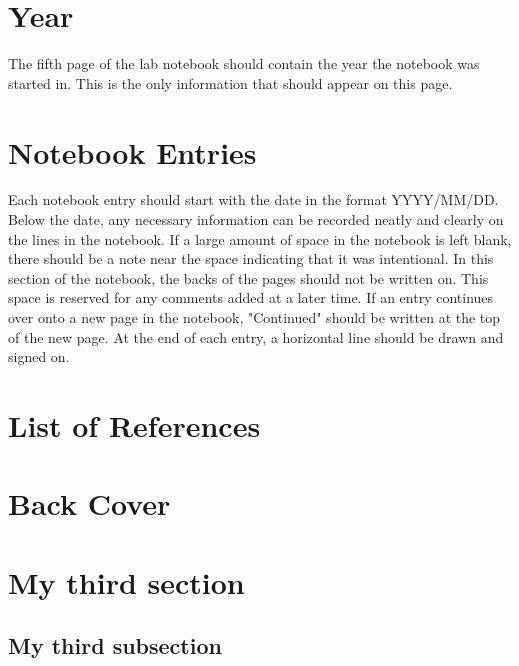 \documentclass[11pt, oneside]{article}   	%
\begin{document}
\section{Year}

The fifth page of the lab notebook should contain the year the notebook was started in. This is the only information that should appear on this page.

\section{Notebook Entries}

Each notebook entry should start with the date in the format YYYY/MM/DD. Below the date, any necessary information can be recorded neatly and clearly on the lines in the notebook. If a large amount of space in the notebook is left blank, there should be a note near the space indicating that it was intentional. In this section of the notebook, the backs of the pages should not be written on. This space is reserved for any comments added at a later time. If an entry continues over onto a new page in the notebook, "Continued" should be written at the top of the new page. At the end of each entry, a horizontal line should be drawn and signed on. 

\section{List of References}
\section{Back Cover}	



\section{My third section}				%
\subsection{My third subsection}		%





\newpage							%

\end{document}

